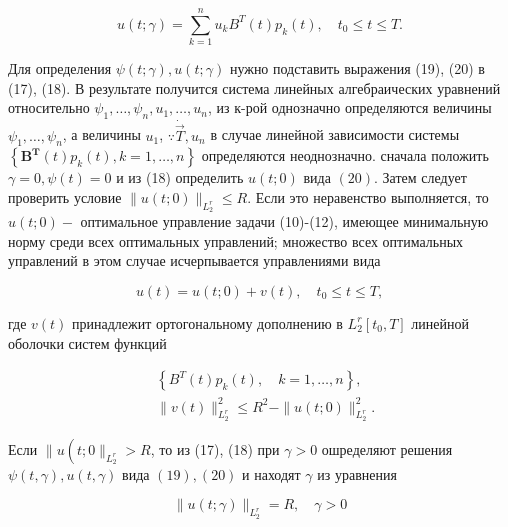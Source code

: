 \documentclass[10pt]{article}
\begin{document}
\[

u(t ; \gamma)=\sum_{k=1}^{n} u_{k} B^{T}(t) p_{k}(t), \quad t_{0} \leqslant t \leqslant T .

\]



Для определения $\psi(t ; \gamma), u(t ; \gamma)$ нужно подставить выражения (19), (20) в (17), (18). В результате получится система линейных алгебраических уравнений относительно $\psi_{1}, \ldots, \psi_{n}, u_{1}, \ldots, u_{n}$, из к-рой однозначно определяются величины $\psi_{1}, \ldots, \psi_{n}$, а величины $u_{1}$, $\because \dot{\vec{T}}, u_{n}$ в случае линейной зависимости системы $\left\{\boldsymbol{B}^{\boldsymbol{T}}(t) p_{k}(t), k=1, \ldots, n\right\}$ определяются неоднозначно. сначала положить $\gamma=0, \psi(t)=0$ и из (18) определить $u(t ; 0)$ вида $(20)$. Затем следует проверить условие $\|u(t ; 0)\|_{L_{2}^{r}} \leqslant R$. Если это неравенство выполняется, то $u(t ; 0)-$ оптимальное управление задачи (10)-(12), имеющее минимальную норму среди всех оптимальных управлений; множество всех оптимальных управлений в этом случае исчерпывается управлениями вида



\[

u(t)=u(t ; 0)+v(t), \quad t_{0} \leqslant t \leqslant T,

\]



где $v(t)$ принадлежит ортогональному дополнению в $L_{2}^{r}\left[t_{0}, T\right]$ линейной оболочки систем функций



\[

\begin{aligned}

& \left\{B^{T}(t) p_{k}(t), \quad k=1, \ldots, n\right\}, \\

& \|v(t)\|_{L_{2}^{r}}^{2} \leqslant R^{2}-\|u(t ; 0)\|_{L_{2}^{r}}^{2} .

\end{aligned}

\]



Если $\| u\left(t ; 0 \|_{L_{2}^{r}}>R\right.$, то из (17), (18) при $\gamma>0$ ошределяют решения $\psi(t, \gamma), u(t, \gamma)$ вида $(19),(20)$ и находят $\gamma$ из уравнения



\[

\|u(t ; \gamma)\|_{L_{2}^{r}}=R, \quad \gamma>0

\]
\end{document}
